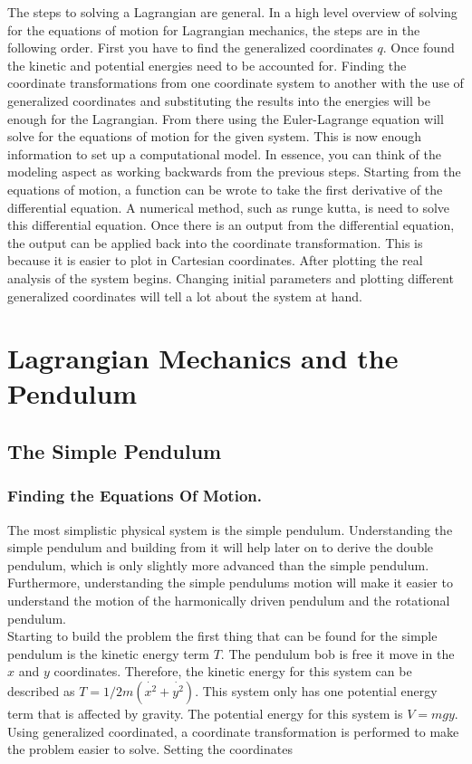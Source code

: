 \documentclass[runningheads]{llncs}
\begin{document}
The steps to solving a Lagrangian are general. In a high level overview of solving for the equations of motion for Lagrangian mechanics, the steps are in the following order. First you have to find the generalized coordinates $q$. Once found the kinetic and potential energies need to be accounted for. Finding the coordinate transformations from one coordinate system to another with the use of generalized coordinates and substituting the results into the energies will be enough for the Lagrangian. From there using the Euler-Lagrange equation will solve for the equations of motion for the given system. This is now enough information to set up a computational model. In essence, you can think of the modeling aspect as working backwards from the previous steps. Starting from the equations of motion, a function can be wrote to take the first derivative of the differential equation. A numerical method, such as runge kutta, is need to solve this differential equation. Once there is an output from the differential equation, the output can be applied back into the coordinate transformation. This is because it is easier to plot in Cartesian coordinates. After plotting the real analysis of the system begins. Changing initial parameters and plotting different generalized coordinates will tell a lot about the system at hand.


\section{Lagrangian Mechanics and the Pendulum}
\subsection{The Simple Pendulum}

\subsubsection{Finding the Equations Of Motion.}

The most simplistic physical system is the simple pendulum. Understanding the simple pendulum and building from it will help later on to derive the double pendulum, which is only slightly more advanced than the simple pendulum. Furthermore, understanding the simple pendulums motion will make it easier to understand the motion of the harmonically driven pendulum and the rotational pendulum. \\

Starting to build the problem the first thing that can be found for the simple pendulum is the kinetic energy term $T$. The pendulum bob is free it move in the $x$ and $y$ coordinates. Therefore, the kinetic energy for this system can be described as $T = 1/2m(\dot{x^2} + \dot{y^2})$. This system only has one potential energy term that is affected by gravity. The potential energy for this system is $V = mgy$. Using generalized coordinated, a coordinate transformation is performed to make the problem easier to solve. Setting the coordinates 
\end{document}
